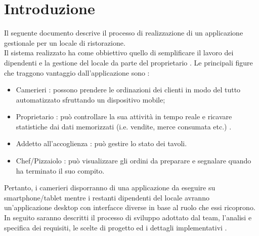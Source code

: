 \chapter{Introduzione}
Il seguente documento descrive il processo di realizzazione di un applicazione gestionale per un locale di ristorazione. 
\\Il sistema realizzato ha come obbiettivo quello di semplificare il lavoro dei dipendenti e la gestione del locale da parte del proprietario . 
Le principali figure che traggono vantaggio dall'applicazione sono :
\begin{itemize}
	\item Camerieri : possono prendere le ordinazioni dei clienti in modo del tutto automatizzato sfruttando un dispositivo mobile;
	\item Proprietario : può controllare la sua attività in tempo reale e ricavare statistiche dai dati memorizzati (i.e. vendite, merce consumata etc.) .
	\item Addetto all'accoglienza : può gestire lo stato dei tavoli.
	\item Chef/Pizzaiolo : può visualizzare gli ordini da preparare e segnalare quando ha terminato il suo compito.
\end{itemize}
Pertanto, i camerieri disporranno di una applicazione da eseguire su smartphone/tablet mentre i restanti dipendenti del locale avranno un'applicazione desktop con interfacce diverse in base al ruolo che essi ricoprono.
In seguito saranno descritti il processo di sviluppo adottato dal team, l'analisi e specifica dei requisiti, le scelte di progetto ed i dettagli implementativi .
